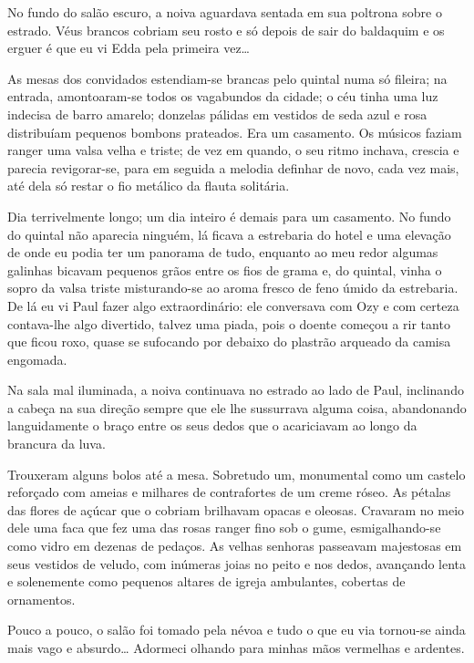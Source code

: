 No fundo do salão escuro, a noiva aguardava sentada em sua poltrona sobre o estrado. Véus brancos cobriam seu rosto e só depois de sair do baldaquim e os erguer é que eu vi Edda pela primeira vez\ldots{}

As mesas dos convidados estendiam-se brancas pelo quintal numa só fileira; na entrada, amontoaram-se todos os vagabundos da cidade; o céu tinha uma luz indecisa de barro amarelo; donzelas pálidas em vestidos de seda azul e rosa distribuíam pequenos bombons prateados. Era um casamento. Os músicos faziam ranger uma valsa velha e triste; de vez em quando, o seu ritmo inchava, crescia e parecia revigorar-se, para em seguida a melodia definhar de novo, cada vez mais, até dela só restar o fio metálico da flauta solitária.

Dia terrivelmente longo; um dia inteiro é demais para um casamento. No fundo do quintal não aparecia ninguém, lá ficava a estrebaria do hotel e uma elevação de onde eu podia ter um panorama de tudo, enquanto ao meu redor algumas galinhas bicavam pequenos grãos entre os fios de grama e, do quintal, vinha o sopro da valsa triste misturando-se ao aroma fresco de feno úmido da estrebaria. De lá eu vi Paul fazer algo extraordinário: ele conversava com Ozy e com certeza contava-lhe algo divertido, talvez uma piada, pois o doente começou a rir tanto que ficou roxo, quase se sufocando por debaixo do plastrão arqueado da camisa engomada.


Na sala mal iluminada, a noiva continuava no estrado ao lado de Paul, inclinando a cabeça na sua direção sempre que ele lhe sussurrava alguma coisa, abandonando languidamente o braço entre os seus dedos que o acariciavam ao longo da brancura da luva.

Trouxeram alguns bolos até a mesa. Sobretudo um, monumental como um castelo reforçado com ameias e milhares de contrafortes de um creme róseo. As pétalas das flores de açúcar que o cobriam brilhavam opacas e oleosas. Cravaram no meio dele uma faca que fez uma das rosas ranger fino sob o gume, esmigalhando-se como vidro em dezenas de pedaços. As velhas senhoras passeavam majestosas em seus vestidos de veludo, com inúmeras joias no peito e nos dedos, avançando lenta e solenemente como pequenos altares de igreja ambulantes, cobertas de ornamentos.

Pouco a pouco, o salão foi tomado pela névoa e tudo o que eu via tornou-se ainda mais vago e absurdo\ldots{} Adormeci olhando para minhas mãos vermelhas e ardentes.


